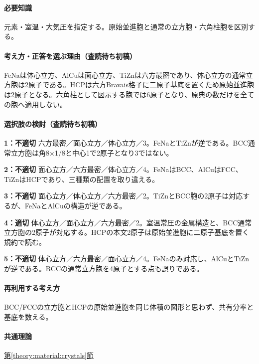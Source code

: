\paragraph{必要知識} 元素・室温・大気圧を指定する。原始並進胞と通常の立方胞・六角柱胞を区別する。

\paragraph{考え方・正答を選ぶ理由（査読待ち初稿）} FeNaは体心立方、AlCuは面心立方、TiZnは六方最密であり、体心立方の通常立方胞は2原子である。HCPは六方Bravais格子に二原子基底を置くため原始並進胞は2原子となる。六角柱として図示する胞では6原子となり、原典の数だけを全ての胞へ適用しない。

\paragraph{選択肢の検討（査読待ち初稿）}\mbox{}\par

\noindent\textbf{1：不適切} 六方最密／面心立方／体心立方／3。FeNaとTiZnが逆である。BCC通常立方胞は角8×1/8と中心1で2原子となり3ではない。\par

\noindent\textbf{2：不適切} 面心立方／六方最密／体心立方／4。FeNaはBCC、AlCuはFCC、TiZnはHCPであり、三種類の配置を取り違える。\par

\noindent\textbf{3：不適切} 面心立方／体心立方／六方最密／2。TiZnとBCC胞の2原子は対応するが、FeNaとAlCuの構造が逆である。\par

\noindent\textbf{4：適切} 体心立方／面心立方／六方最密／2。室温常圧の金属構造と、BCC通常立方胞の2原子が対応する。HCPの本文2原子は原始並進胞に二原子基底を置く規約で読む。\par

\noindent\textbf{5：不適切} 体心立方／六方最密／面心立方／4。FeNaのみ対応し、AlCuとTiZnが逆である。BCCの通常立方胞を4原子とする点も誤りである。\par

\paragraph{再利用する考え方} BCC/FCCの立方胞とHCPの原始並進胞を同じ体積の図形と思わず、共有分率と基底を数える。

\paragraph{共通理論} \hyperref[theory:material:crystals]{第\ref*{theory:material:crystals}節}

